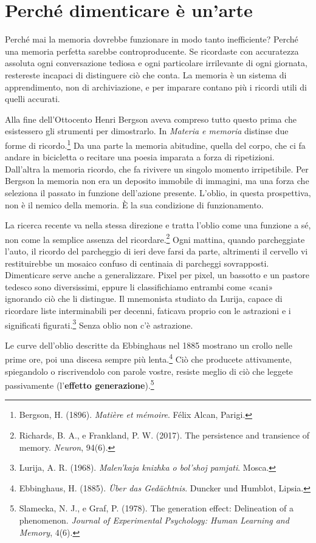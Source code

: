 \section{Perché dimenticare è un'arte}

Perché mai la memoria dovrebbe funzionare in modo tanto inefficiente? Perché una memoria perfetta sarebbe controproducente. Se ricordaste con accuratezza assoluta ogni conversazione tediosa e ogni particolare irrilevante di ogni giornata, restereste incapaci di distinguere ciò che conta. La memoria è un sistema di apprendimento, non di archiviazione, e per imparare contano più i ricordi utili di quelli accurati.

Alla fine dell'Ottocento Henri Bergson aveva compreso tutto questo prima che esistessero gli strumenti per dimostrarlo. In \textit{Materia e memoria} distinse due forme di ricordo.\footnote{Bergson, H. (1896). \textit{Matière et mémoire}. Félix Alcan, Parigi.} Da una parte la memoria abitudine, quella del corpo, che ci fa andare in bicicletta o recitare una poesia imparata a forza di ripetizioni. Dall'altra la memoria ricordo, che fa rivivere un singolo momento irripetibile. Per Bergson la memoria non era un deposito immobile di immagini, ma una forza che seleziona il passato in funzione dell'azione presente. L'oblio, in questa prospettiva, non è il nemico della memoria. È la sua condizione di funzionamento.

La ricerca recente va nella stessa direzione e tratta l'oblio come una funzione a sé, non come la semplice assenza del ricordare.\footnote{Richards, B. A., e Frankland, P. W. (2017). The persistence and transience of memory. \textit{Neuron}, 94(6).} Ogni mattina, quando parcheggiate l'auto, il ricordo del parcheggio di ieri deve farsi da parte, altrimenti il cervello vi restituirebbe un mosaico confuso di centinaia di parcheggi sovrapposti. Dimenticare serve anche a generalizzare. Pixel per pixel, un bassotto e un pastore tedesco sono diversissimi, eppure li classifichiamo entrambi come «cani» ignorando ciò che li distingue. Il mnemonista studiato da Lurija, capace di ricordare liste interminabili per decenni, faticava proprio con le astrazioni e i significati figurati.\footnote{Lurija, A. R. (1968). \textit{Malen'kaja knizhka o bol'shoj pamjati}. Mosca.} Senza oblio non c'è astrazione.

Le curve dell'oblio descritte da Ebbinghaus nel 1885 mostrano un crollo nelle prime ore, poi una discesa sempre più lenta.\footnote{Ebbinghaus, H. (1885). \textit{Über das Gedächtnis}. Duncker und Humblot, Lipsia.} Ciò che producete attivamente, spiegandolo o riscrivendolo con parole vostre, resiste meglio di ciò che leggete passivamente (l'\textbf{effetto generazione}).\footnote{Slamecka, N. J., e Graf, P. (1978). The generation effect: Delineation of a phenomenon. \textit{Journal of Experimental Psychology: Human Learning and Memory}, 4(6).}

